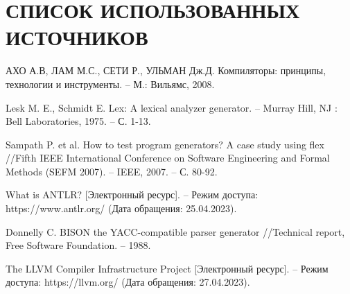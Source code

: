 \section*{СПИСОК ИСПОЛЬЗОВАННЫХ ИСТОЧНИКОВ}

\begingroup
\renewcommand{\section}[2]{}
\begin{thebibliography}{}
	 АХО А.В, ЛАМ М.С., СЕТИ Р., УЛЬМАН Дж.Д. Компиляторы: принципы, технологии и инструменты. – М.: Вильямс, 2008.
	
	 Lesk M. E., Schmidt E. Lex: A lexical analyzer generator. – Murray Hill, NJ : Bell Laboratories, 1975. – С. 1-13.
	
	 Sampath P. et al. How to test program generators? A case study using flex //Fifth IEEE International Conference on Software Engineering and Formal Methods (SEFM 2007). – IEEE, 2007. – С. 80-92.
	
	 What is ANTLR? [Электронный ресурс]. -- Режим доступа: https://www.antlr.org/ (Дата обращения: 25.04.2023).
	
	 Donnelly C. BISON the YACC-compatible parser generator //Technical report, Free Software Foundation. – 1988.
	
	 The LLVM Compiler Infrastructure Project [Электронный ресурс]. -- Режим доступа: https://llvm.org/ (Дата обращения: 27.04.2023).
	
	
	
	
	
	
	
	
	
	
	
	
	
	
	
	
	
	
	
\end{thebibliography}
\endgroup

\pagebreak